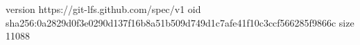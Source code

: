 version https://git-lfs.github.com/spec/v1
oid sha256:0a2829d0f3e0290d137f16b8a51b509d749d1c7afe41f10c3ccf566285f9866c
size 11088
